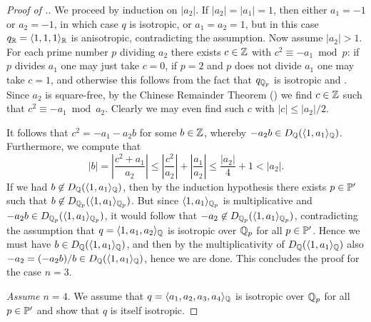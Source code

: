 \documentclass[12pt, leqno, british]{amsart}
\begin{document}
\begin{proof}[Proof of .]
We proceed by induction on $\lvert a_2 \rvert$.
If $\lvert a_2 \rvert = \lvert a_1 \rvert = 1$, then either $a_1 = -1$ or $a_2 = -1$, in which case $q$ is isotropic, or $a_1 = a_2 = 1$, but in this case $q_\mathbb R = \langle 1, 1, 1 \rangle_\mathbb R$ is anisotropic, contradicting the assumption.
Now assume $\lvert a_2 \rvert > 1$.
For each prime number $p$ dividing $a_2$ there exists $c \in \mathbb Z$ with $c^2 \equiv -a_1 \bmod p$: if $p$ divides $a_1$ one may just take $c = 0$, if $p = 2$ and $p$ does not divide $a_1$ one may take $c = 1$, and otherwise this follows from the fact that $q_{\mathbb Q_p}$ is isotropic and .
Since $a_2$ is square-free, by the Chinese Remainder Theorem () we find $c \in \mathbb Z$ such that $c^2 \equiv -a_1 \bmod a_2$.
Clearly we may even find such $c$ with $\lvert c \rvert \leq \lvert a_2 \rvert/2$.

It follows that $c^2 = -a_1 - a_2b$ for some $b \in \mathbb Z$, whereby $-a_2b \in D_\mathbb Q(\langle 1, a_1 \rangle_\mathbb Q)$.
Furthermore, we compute that
$$ \lvert b \rvert = \left\lvert \frac{c^2 + a_1}{a_2} \right\rvert \leq \left\lvert \frac{c^2}{a_2} \right\rvert + \left\lvert \frac{a_1}{a_2} \right\rvert \leq \frac{\lvert a_2 \rvert}{4} + 1 < \lvert a_2 \rvert.$$
If we had $b \not\in D_\mathbb Q(\langle 1, a_1 \rangle_{\mathbb Q})$, then by the induction hypothesis there exists $p \in \mathbb P'$ such that $b \not\in D_{\mathbb Q_p}(\langle 1, a_1 \rangle_{\mathbb Q_p})$.
But since $\langle 1, a_1 \rangle_{\mathbb Q_p}$ is multiplicative and $-a_2b \in D_{\mathbb Q_p}(\langle 1, a_1 \rangle_{\mathbb Q_p})$, it would follow that $-a_2 \not\in  D_{\mathbb Q_p}(\langle 1, a_1 \rangle_{\mathbb Q_p})$, contradicting the assumption that $q = \langle 1, a_1, a_2 \rangle_{\mathbb Q}$ is isotropic over $\mathbb Q_p$ for all $p \in \mathbb P'$.
Hence we must have $b \in D_\mathbb Q(\langle 1, a_1 \rangle_{\mathbb Q})$, and then by the multiplicativity of $ D_\mathbb Q(\langle 1, a_1 \rangle_{\mathbb Q})$ also $-a_2 = (-a_2b)/b \in D_{\mathbb Q}(\langle 1, a_1 \rangle_{\mathbb Q})$, hence we are done.
This concludes the proof for the case $n = 3$.

\emph{Assume $n = 4$}.
We assume that $q = \langle a_1, a_2, a_3, a_4 \rangle_{\mathbb Q}$ is isotropic over $\mathbb Q_p$ for all $p \in \mathbb P'$ and show that $q$ is itself isotropic.


\end{proof}
\end{document}
